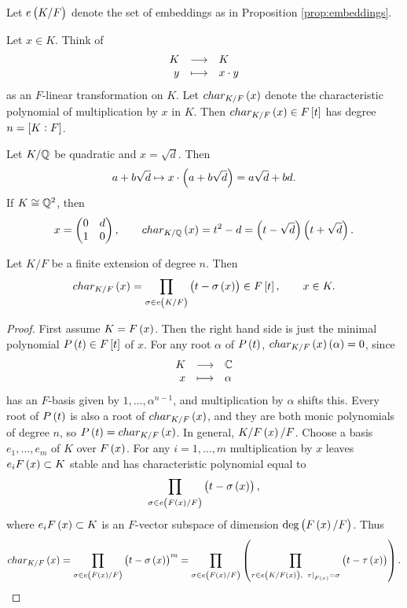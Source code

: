 \begin{notation*}
Let $ e\br{K / F} $ denote the set of embeddings as in Proposition \ref{prop:embeddings}.
\end{notation*}

Let $ x \in K $. Think of
$$ \function{K}{K}{y}{x \cdot y} $$
as an $ F $-linear transformation on $ K $. Let $ char_{K / F}\br{x} $ denote the characteristic polynomial of multiplication by $ x $ in $ K $. Then $ char_{K / F}\br{x} \in F\sbr{t} $ has degree $ n = \sbr{K : F} $.

\begin{example*}
Let $ K / \mathbb{Q} $ be quadratic and $ x = \sqrt{d} $. Then
$$ a + b\sqrt{d} \mapsto x \cdot \br{a + b\sqrt{d}} = a\sqrt{d} + bd. $$
If $ K \cong \mathbb{Q}^2 $, then
$$ x = \twobytwo{0}{d}{1}{0}, \qquad char_{K / \Q}\br{x} = t^2 - d = \br{t - \sqrt{d}}\br{t + \sqrt{d}}. $$
\end{example*}

\begin{proposition}
Let $ K / F $ be a finite extension of degree $ n $. Then
$$ char_{K / F}\br{x} = \prod_{\sigma \in e\br{K / F}} \br{t - \sigma\br{x}} \in F\sbr{t}, \qquad x \in K. $$
\end{proposition}

\pagebreak

\begin{proof}
First assume $ K = F\br{x} $. Then the right hand side is just the minimal polynomial $ P\br{t} \in F\sbr{t} $ of $ x $. For any root $ \alpha $ of $ P\br{t} $, $ char_{K / F}\br{x}\br{\alpha} = 0 $, since
$$ \function{K}{\C}{x}{\alpha} $$
has an $ F $-basis given by $ 1, \dots, \alpha^{n - 1} $, and multiplication by $ \alpha $ shifts this. Every root of $ P\br{t} $ is also a root of $ char_{K / F}\br{x} $, and they are both monic polynomials of degree $ n $, so $ P\br{t} = char_{K / F}\br{x} $. In general, $ K / F\br{x} / F $. Choose a basis $ e_1, \dots, e_m $ of $ K $ over $ F\br{x} $. For any $ i = 1, \dots, m $ multiplication by $ x $ leaves $ e_iF\br{x} \subset K $ stable and has characteristic polynomial equal to
$$ \prod_{\sigma \in e\br{F\br{x} / F}} \br{t - \sigma\br{x}}, $$
where $ e_iF\br{x} \subset K $ is an $ F $-vector subspace of dimension $ \deg\br{F\br{x} / F} $. Thus
$$ char_{K / F}\br{x} = \prod_{\sigma \in e\br{F\br{x} / F}} \br{t - \sigma\br{x}}^m = \prod_{\sigma \in e\br{F\br{x} / F}} \br{\prod_{\tau \in e\br{K / F\br{x}}, \ \eval{\tau}_{F\br{x}} = \sigma} \br{t - \tau\br{x}}}. $$
\end{proof}

